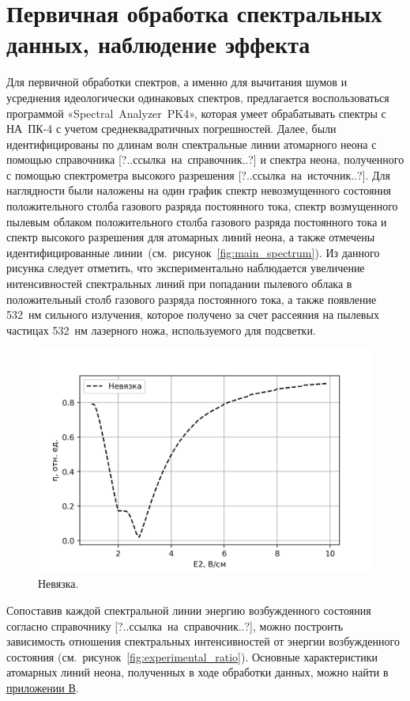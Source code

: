 \section{Первичная обработка спектральных данных, наблюдение эффекта}

Для первичной обработки спектров, а именно для вычитания шумов и усреднения идеологически одинаковых спектров,
предлагается воспользоваться программой «Spectral~Analyzer~PK4», которая умеет обрабатывать спектры с НА~ПК-4 с учетом
среднеквадратичных погрешностей. Далее, были идентифицированы по длинам волн спектральные линии атомарного неона с помощью справочника
[?..ссылка~на~справочник..?] и спектра неона, полученного с помощью спектрометра высокого разрешения [?..ссылка~на~источник..?].
Для наглядности были наложены на один график
спектр невозмущенного состояния положительного столба газового разряда постоянного тока,
спектр возмущенного пылевым облаком положительного столба газового разряда постоянного тока и
спектр высокого разрешения для атомарных линий неона, а также отмечены идентифицированные линии~(см.~рисунок~\ref{fig:main_spectrum}).
Из данного рисунка следует отметить, что экспериментально наблюдается увеличение интенсивностей спектральных
линий при попадании пылевого облака в положительный столб газового разряда постоянного тока,
а также появление 532~нм сильного излучения, которое получено за счет рассеяния на пылевых частицах
532~нм лазерного ножа, используемого для подсветки.
\begin{figure}[t]
  \centering
  \includegraphics[width=16cm]{figures/discrepancy}
  \caption{Невязка.}
  \label{fig:discrepancy}
\end{figure}

Сопоставив каждой спектральной линии энергию возбужденного состояния согласно справочнику [?..ссылка~на~справочник..?],
можно построить зависимость отношения спектральных интенсивностей от энергии возбужденного состояния (см.~рисунок~\ref{fig:experimental_ratio}).
Основные характеристики атомарных линий неона, полученных в ходе обработки данных, можно найти в \hyperref[app:app3]{приложении В}.

